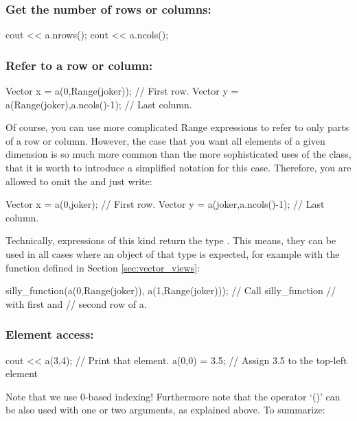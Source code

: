 \subsubsection{Get the number of rows or columns:}
\begin{code}
cout << a.nrows();
cout << a.ncols();
\end{code}

\subsubsection{Refer to a row or column:}
\begin{code}
Vector x = a(0,Range(joker));           // First row.
Vector y = a(Range(joker),a.ncols()-1); // Last column.
\end{code}
Of course, you can use more complicated Range expressions to refer to
only parts of a row or column. However, the case that you want all
elements of a given dimension is so
much more common than the more sophisticated uses of the
 class, that it is worth to introduce a simplified
notation for this case. Therefore, you are allowed to
omit the  and just write:
\begin{code}
Vector x = a(0,joker);           // First row.
Vector y = a(joker,a.ncols()-1); // Last column.
\end{code}

Technically, expressions of this kind return the type
. This means, they can be used in all cases
where an object of that type is expected, for example with the
function defined in Section \ref{sec:vector_views}:

\begin{code}
silly_function(a(0,Range(joker)),
               a(1,Range(joker))); // Call silly_function
                                   // with first and
                                   // second row of a.
\end{code}



\subsubsection{Element access:}
\begin{code}
cout << a(3,4); // Print that element.
a(0,0) = 3.5;   // Assign 3.5 to the top-left element
\end{code}

Note that we use 0-based indexing! Furthermore note that the operator
`()' can be also used with one or two  arguments, as
explained above. To summarize:

